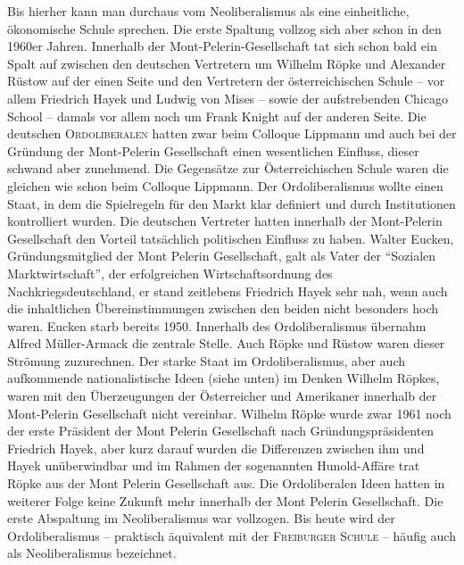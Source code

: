 Bis hierher kann man durchaus vom Neoliberalismus als eine einheitliche, ökonomische Schule sprechen. Die erste Spaltung vollzog sich aber schon in den 1960er Jahren. Innerhalb der Mont-Pelerin-Gesellschaft tat sich schon bald ein Spalt auf zwischen den deutschen Vertretern um Wilhelm Röpke und Alexander Rüstow auf der einen Seite und den Vertretern der österreichischen Schule -- vor allem Friedrich Hayek und Ludwig von Mises -- sowie der aufstrebenden Chicago School -- damals vor allem noch um Frank Knight auf der anderen Seite. Die deutschen \textsc{Ordoliberalen} hatten zwar beim Colloque Lippmann und auch bei der Gründung der Mont-Pelerin Gesellschaft einen wesentlichen Einfluss, dieser schwand aber zunehmend. Die Gegensätze zur Österreichischen Schule waren die gleichen wie schon beim Colloque Lippmann. Der Ordoliberalismus wollte einen Staat, in dem die Spielregeln für den Markt klar definiert und durch Institutionen kontrolliert wurden. Die deutschen Vertreter hatten innerhalb der Mont-Pelerin Gesellschaft den Vorteil tatsächlich politischen Einfluss zu haben. Walter Eucken, Gründungsmitglied der Mont Pelerin Gesellschaft, galt als Vater der "`Sozialen Marktwirtschaft"', der erfolgreichen Wirtschaftsordnung des Nachkriegsdeutschland, er stand zeitlebens Friedrich Hayek sehr nah, wenn auch die inhaltlichen Übereinstimmungen zwischen den beiden nicht besonders hoch waren. Eucken starb bereits 1950. Innerhalb des Ordoliberalismus übernahm Alfred Müller-Armack die zentrale Stelle. Auch Röpke und Rüstow waren dieser Strömung zuzurechnen. Der starke Staat im Ordoliberalismus, aber auch aufkommende nationalistische Ideen (siehe unten) im Denken Wilhelm Röpkes, waren mit den Überzeugungen der Österreicher und Amerikaner innerhalb der Mont-Pelerin Gesellschaft nicht vereinbar. Wilhelm Röpke wurde zwar 1961 noch der erste Präsident der Mont Pelerin Gesellschaft nach Gründungspräsidenten Friedrich Hayek, aber kurz darauf wurden die Differenzen zwischen ihm und Hayek unüberwindbar und im Rahmen der sogenannten Hunold-Affäre trat Röpke aus der Mont Pelerin Gesellschaft aus. Die Ordoliberalen Ideen hatten in weiterer Folge keine Zukunft mehr innerhalb der Mont Pelerin Gesellschaft. Die erste Abspaltung im Neoliberalismus war vollzogen. Bis heute wird der Ordoliberalismus -- praktisch äquivalent mit der \textsc{Freiburger Schule} -- häufig auch als Neoliberalismus bezeichnet.

